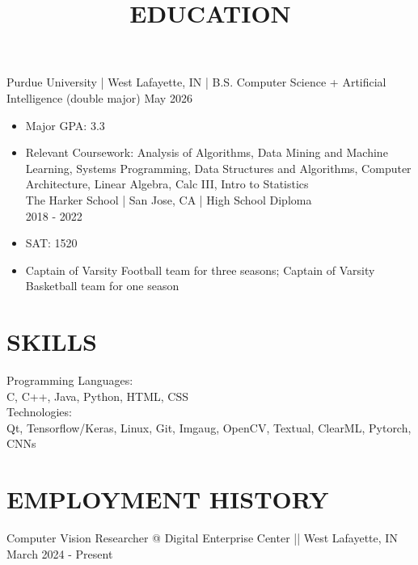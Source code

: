 \documentclass[10pt]{article}
\title{EDUCATION }
\author{}
\date{}
\begin{document}
\maketitle
Purdue University | West Lafayette, IN | B.S. Computer Science + Artificial Intelligence (double major) May 2026

\begin{itemize}
  \item Major GPA: 3.3
  \item Relevant Coursework: Analysis of Algorithms, Data Mining and Machine Learning, Systems Programming, Data Structures and Algorithms, Computer Architecture, Linear Algebra, Calc III, Intro to Statistics\\
The Harker School | San Jose, CA | High School Diploma\\
2018 - 2022
  \item SAT: 1520
  \item Captain of Varsity Football team for three seasons; Captain of Varsity Basketball team for one season
\end{itemize}

\section*{SKILLS}
Programming Languages:\\
C, C++, Java, Python, HTML, CSS\\
Technologies:\\
Qt, Tensorflow/Keras, Linux, Git, Imgaug, OpenCV, Textual, ClearML, Pytorch, CNNs

\section*{EMPLOYMENT HISTORY}
Computer Vision Researcher @ Digital Enterprise Center || West Lafayette, IN March 2024 - Present
\end{document}
